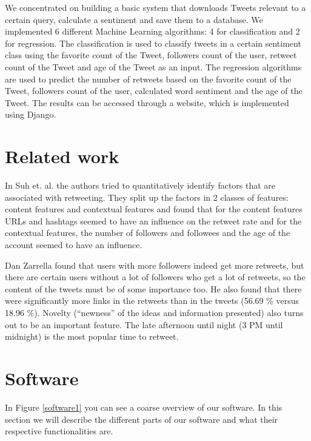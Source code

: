 \documentclass[10pt]{IEEEtran}
\begin{document}
We concentrated on building a basic system that downloads Tweets relevant to a certain query, calculate a sentiment and save them to a database. We implemented 6 different Machine Learning algorithms: 4 for classification and 2 for regression. The classification is used to classify tweets in a certain sentiment class using the favorite count of the Tweet, followers count of the user, retweet count of the Tweet and age of the Tweet as an input. The regression algorithms are used to predict the number of retweets based on the favorite count of the Tweet, followers count of the user, calculated word sentiment and the age of the Tweet. The results can be accessed through a website, which is implemented using Django.

\section{Related work}

In Suh et. al. \cite{want_to_be_retweeted} the authors tried to quantitatively identify factors that are associated with retweeting. They split up the factors in 2 classes of features: content features and contextual features and found that for the content features URLs and hashtags seemed to have an influence on the retweet rate and for the contextual features, the number of followers and followees and the age of the account seemed to have an influence. 

Dan Zarrella \cite{science_of_retweets} found that users with more followers indeed get more retweets, but there are certain users without a lot of followers who get a lot of retweets, so the content of the tweets must be of some importance too. He also found that there were significantly more links in the retweets than in the tweets (56.69 \% versus 18.96 \%). Novelty (``newness'' of the ideas and information presented) also turns out to be an important feature. The late afternoon until night (3 PM until midnight) is the most popular time to retweet. 

\section{Software}

In Figure \ref{software1} you can see a coarse overview of our software. In this section we will describe the different parts of our software and what their respective functionalities are.
\end{document}
